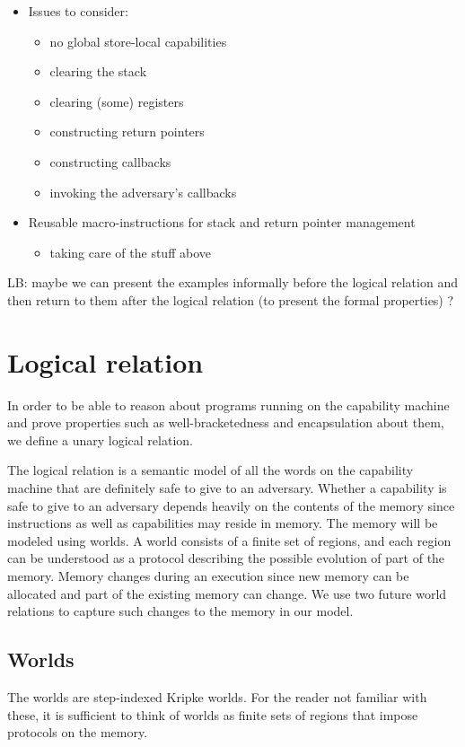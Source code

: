 \documentclass[compsoc,conference,letterpaper,fleqn]{IEEEtran}
\begin{document}
\begin{itemize}
\item Issues to consider:
\begin{itemize}
\item no global store-local capabilities
\item clearing the stack
\item clearing (some) registers
\item constructing return pointers
\item constructing callbacks
\item invoking the adversary's callbacks
\end{itemize}
\item Reusable macro-instructions for stack and return pointer management
\begin{itemize}
\item taking care of the stuff above
\end{itemize}
\end{itemize}

LB: maybe we can present the examples informally before the logical relation and then return to them after the logical relation (to present the formal properties) ?

\section{Logical relation}
In order to be able to reason about programs running on the capability
machine and prove properties such as well-bracketedness and
encapsulation about them, we define a unary logical relation.

The logical relation is a semantic model of all the words on the
capability machine that are definitely safe to give to an
adversary. Whether a capability is safe to give to an adversary
depends heavily on the contents of the memory since instructions as well
as capabilities may reside in memory. The memory will be modeled using
worlds. A world consists of a finite set of regions, and each region
can be understood as a protocol describing the possible evolution of
part of the memory. Memory changes during an
execution since new memory can be allocated and part of the existing
memory can change. We use two future world relations to capture
such changes to the memory in our model.
%

\subsection{Worlds}
The worlds are step-indexed Kripke worlds. For the reader not familiar
with these, it is sufficient to think of worlds as finite sets of
regions that impose protocols on the memory.
\end{document}
